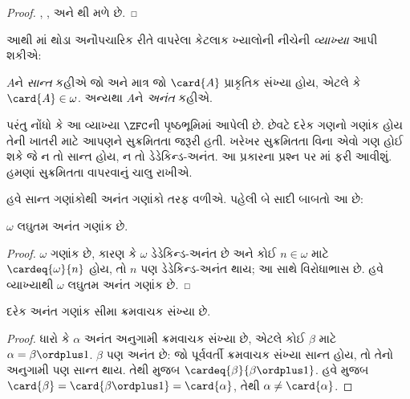 \documentclass[../../../include/open-logic-section]{subfiles}
\begin{document}
\begin{proof}
,
,
અને થી મળે છે.
\end{proof}

આથી માં થોડા અનૌપચારિક રીતે
વાપરેલા કેટલાક ખ્યાલોની નીચેની \emph{વ્યાખ્યા} આપી શકીએ:

\begin{defn}
$A$ને \emph{સાન્ત} કહીએ જો અને માત્ર જો
$\card{A}$ પ્રાકૃતિક સંખ્યા હોય, એટલે કે
$\card{A} \in \omega$. અન્યથા $A$ને
\emph{અનંત} કહીએ.
\end{defn}
\noindent
પરંતુ નોંધો કે આ વ્યાખ્યા $\ZFC$ની પૃષ્ઠભૂમિમાં
આપેલી છે. છેવટે દરેક ગણનો ગણાંક હોય તેની ખાતરી
માટે આપણને સુક્રમિતતા જરૂરી હતી. ખરેખર સુક્રમિતતા
વિના એવો ગણ હોઈ શકે જે ન તો સાન્ત હોય, ન તો
ડેડેકિન્ડ-અનંત. આ પ્રકારના પ્રશ્ન પર
માં ફરી આવીશું. હમણાં
સુક્રમિતતા વાપરવાનું ચાલુ રાખીએ.

હવે સાન્ત ગણાંકોથી અનંત ગણાંકો તરફ વળીએ.
પહેલી બે સાદી બાબતો આ છે:

\begin{cor}
$\omega$ લઘુતમ અનંત ગણાંક છે.
\end{cor}

\begin{proof}
$\omega$ ગણાંક છે, કારણ કે $\omega$ ડેડેકિન્ડ-અનંત
છે અને કોઈ $n \in \omega$ માટે
$\cardeq{\omega}{n}$ હોય, તો $n$ પણ ડેડેકિન્ડ-અનંત
થાય; આ 
સાથે વિરોધાભાસ છે. હવે વ્યાખ્યાથી $\omega$
લઘુતમ અનંત ગણાંક છે.
\end{proof}

\begin{cor}
દરેક અનંત ગણાંક સીમા ક્રમવાચક સંખ્યા છે.
\end{cor}

\begin{proof}
ધારો કે $\alpha$ અનંત અનુગામી ક્રમવાચક સંખ્યા છે,
એટલે કોઈ $\beta$ માટે $\alpha = \beta
\ordplus 1$. $\beta$ પણ અનંત છે: જો પૂર્વવર્તી
ક્રમવાચક સંખ્યા સાન્ત હોય, તો તેનો અનુગામી પણ
સાન્ત થાય. તેથી
મુજબ $\cardeq{\beta}{\beta \ordplus 1}$.
હવે 
મુજબ $\card{\beta} = \card{\beta\ordplus 1} =
\card{\alpha}$, તેથી $\alpha \neq \card{\alpha}$.
\end{proof}
\end{document}
